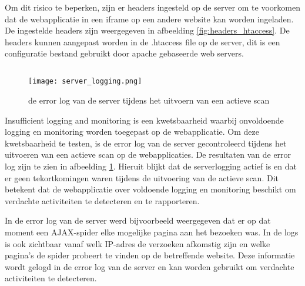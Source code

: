 Om dit risico te beperken, zijn er headers ingesteld op de server om te voorkomen dat de webapplicatie in een iframe op een 
andere website kan worden ingeladen. De ingestelde headers zijn weergegeven in afbeelding \ref{fig:headers_htaccess}. De 
headers kunnen aangepast worden in de .htaccess file op de server, dit is een configuratie bestand gebruikt door apache 
gebaseerde web servers.

\subsection{}
\begin{figure}
    \centering
    \texttt{[image: server\_logging.png]}
    \caption[de error log van de server tijdens het uitvoern van een actieve scan]{de error log van de server tijdens het uitvoern van een actieve scan}
    \label{fig:server_logging}
\end{figure}
Insufficient logging and monitoring is een kwetsbaarheid waarbij onvoldoende logging en monitoring worden toegepast op de 
webapplicatie. Om deze kwetsbaarheid te testen, is de error log van de server gecontroleerd tijdens het uitvoeren van een 
actieve scan op de webapplicaties. De resultaten van de error log zijn te zien in afbeelding \ref{fig:server_logging}. 
Hieruit blijkt dat de serverlogging actief is en dat er geen tekortkomingen waren tijdens de uitvoering van de actieve scan. 
Dit betekent dat de webapplicatie over voldoende logging en monitoring beschikt om verdachte activiteiten te detecteren en te 
rapporteren.

In de error log van de server werd bijvoorbeeld weergegeven dat er op dat moment een AJAX-spider elke mogelijke pagina aan 
het bezoeken was. In de logs is ook zichtbaar vanaf welk IP-adres de verzoeken afkomstig zijn en welke pagina's de spider 
probeert te vinden op de betreffende website. Deze informatie wordt gelogd in de error log van de server en kan worden 
gebruikt om verdachte activiteiten te detecteren.

